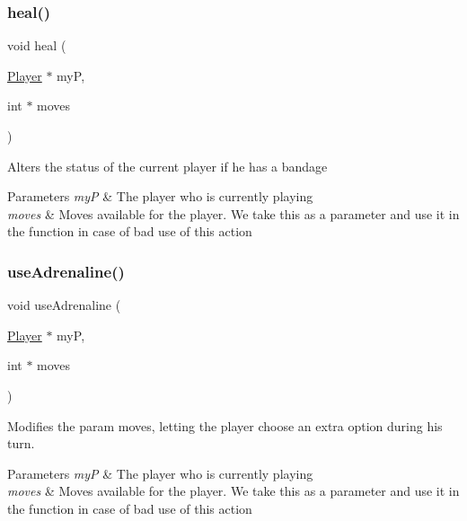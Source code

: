 \subsubsection{\texorpdfstring{heal()}{heal()}}
{\footnotesize\ttfamily void heal (\begin{DoxyParamCaption}\item[{\hyperlink{group__game_gac6f795d0d2e88ee469ddc704329e7cc3}{Player} $\ast$}]{myP,  }\item[{int $\ast$}]{moves }\end{DoxyParamCaption})\hspace{0.3cm}{\ttfamily [static]}}

Alters the status of the current player if he has a bandage 
\begin{DoxyParams}{Parameters}
{\em myP} & The player who is currently playing \\
\hline
{\em moves} & Moves available for the player. We take this as a parameter and use it in the function in case of bad use of this action \\
\hline
\end{DoxyParams}
\mbox{\label{group__game_ga660302bc9e06f744f7492e364abeb37d}} 
\subsubsection{\texorpdfstring{use\+Adrenaline()}{useAdrenaline()}}
{\footnotesize\ttfamily void use\+Adrenaline (\begin{DoxyParamCaption}\item[{\hyperlink{group__game_gac6f795d0d2e88ee469ddc704329e7cc3}{Player} $\ast$}]{myP,  }\item[{int $\ast$}]{moves }\end{DoxyParamCaption})\hspace{0.3cm}{\ttfamily [static]}}

Modifies the param moves, letting the player choose an extra option during his turn. 
\begin{DoxyParams}{Parameters}
{\em myP} & The player who is currently playing \\
\hline
{\em moves} & Moves available for the player. We take this as a parameter and use it in the function in case of bad use of this action \\
\hline
\end{DoxyParams}
\mbox{\label{group__game_gada5c5b8cf9361720770a151aacfb961f}} 
